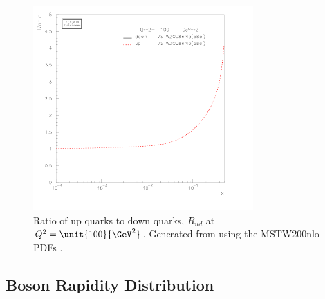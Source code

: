 \begin{figure}[htbp]
  \centering
  \includegraphics[width=0.75\textwidth]{plot_pdf_ratio}
  \caption[Ratio of up quarks to down quarks, $R_{ud}$ at
$Q^2=\unit{100}{\GeV^2}$.] {Ratio of up quarks to down quarks, $R_{ud}$ at
$Q^2=\unit{100}{\GeV^2}$.  Generated from \cite{hepdata} using the MSTW200nlo
PDFs \cite{martin2009parton}.}
  \label{fig:pdf_plots} 
\end{figure}

\subsection{\PW Boson Rapidity Distribution}
\label{wbos:wrapsec}

